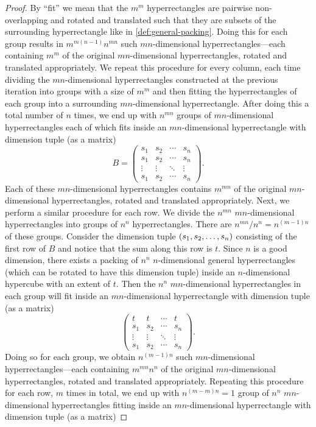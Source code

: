 \begin{proof}
By ``fit'' we mean that the $m^m$ hyperrectangles are pairwise non-overlapping and rotated and translated such that they are subsets of the surrounding hyperrectangle like in \cref{def:general-packing}. Doing this for each group results in $m^{m(n-1)}n^{mn}$ such $mn$-dimensional hyperrectangles---each containing $m^m$ of the original $mn$-dimensional hyperrectangles, rotated and translated appropriately. We repeat this procedure for every column, each time dividing the $mn$-dimensional hyperrectangles constructed at the previous iteration into groups with a size of $m^m$ and then fitting the hyperrectangles of each group into a surrounding $mn$-dimensional hyperrectangle. After doing this a total number of $n$ times, we end up with $n^{mn}$ groups of $mn$-dimensional hyperrectangles each of which fits inside an $mn$-dimensional hyperrectangle with dimension tuple (as a matrix)
\[
B = \begin{pmatrix}
s_1    & s_2    & \cdots & s_n    \\
s_1    & s_2    & \cdots & s_n    \\
\vdots & \vdots & \ddots & \vdots \\
s_1    & s_2    & \cdots & s_n
\end{pmatrix}.
\]
Each of these $mn$-dimensional hyperrectangles contains $m^{mn}$ of the original $mn$-dimensional hyperrectangles, rotated and translated appropriately. Next, we perform a similar procedure for each row. We divide the $n^{mn}$ $mn$-dimensional hyperrectangles into groups of $n^n$ hyperrectangles. There are $n^{mn}/n^n = n^{(m - 1)n}$ of these groups. Consider the dimension tuple $\left( s_1, s_2, \dotsc, s_n \right)$ consisting of the first row of $B$ and notice that the sum along this row is $t$. Since $n$ is a good dimension, there exists a packing of $n^n$ $n$-dimensional general hyperrectangles (which can be rotated to have this dimension tuple) inside an $n$-dimensional hypercube with an extent of $t$. Then the $n^n$ $mn$-dimensional hyperrectangles in each group will fit inside an $mn$-dimensional hyperrectangle with dimension tuple (as a matrix)
\[
\begin{pmatrix}
t      & t      & \cdots & t      \\
s_1    & s_2    & \cdots & s_n    \\
\vdots & \vdots & \ddots & \vdots \\
s_1    & s_2    & \cdots & s_n
\end{pmatrix}.
\]
Doing so for each group, we obtain $n^{(m - 1)n}$ such $mn$-dimensional hyperrectangles---each containing $m^{mn} n^n$ of the original $mn$-dimensional hyperrectangles, rotated and translated appropriately. Repeating this procedure for each row, $m$ times in total, we end up with $n^{(m - m)n} = 1$ group of $n^n$ $mn$-dimensional hyperrectangles fitting inside an $mn$-dimensional hyperrectangle with dimension tuple (as a matrix)

\end{proof}
